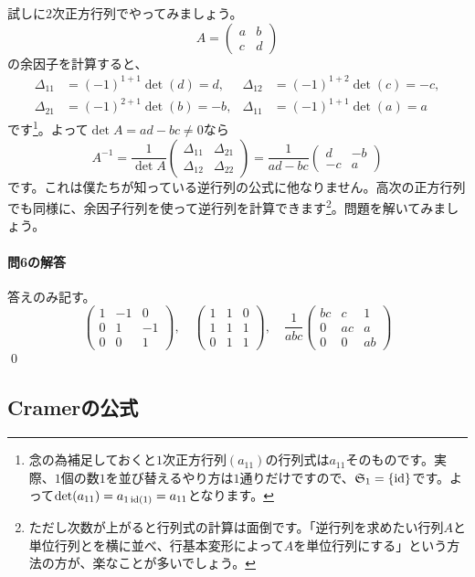 試しに$2$次正方行列でやってみましょう。
\[
A =
\begin{pmatrix}
a & b \\
c & d
\end{pmatrix}
\]
の余因子を計算すると、
\begin{align*}
\Delta_{11} &= (-1)^{1 + 1} \det(d) = d, &
\Delta_{12} &= (-1)^{1 + 2} \det(c) = -c, \\
\Delta_{21} &= (-1)^{2 + 1} \det(b) = -b, &
\Delta_{11} &= (-1)^{1 + 1} \det(a) = a
\end{align*}
です\footnote{念の為補足しておくと$1$次正方行列$(a_{11})$の行列式は$a_{11}$そのものです。実際、$1$個の数$1$を並び替えるやり方は$1$通りだけですので、$\mathfrak{S}_1 = \{\operatorname{id}\}$です。よって$\det (a_{11}) = a_{1 \operatorname{id}(1)} = a_{11}$となります。}。よって$\det A = ad - bc \neq 0$なら
\[
A^{-1}
= \frac{1}{\det A}
\begin{pmatrix}
\Delta_{11} & \Delta_{21} \\
\Delta_{12} & \Delta_{22}
\end{pmatrix}
= \frac{1}{ad - bc}
\begin{pmatrix}
d & -b \\
-c & a
\end{pmatrix}
\]
です。これは僕たちが知っている逆行列の公式に他なりません。高次の正方行列でも同様に、余因子行列を使って逆行列を計算できます\footnote{ただし次数が上がると行列式の計算は面倒です。「逆行列を求めたい行列$A$と単位行列とを横に並べ、行基本変形によって$A$を単位行列にする」という方法の方が、楽なことが多いでしょう。}。問題を解いてみましょう。

\paragraph{問6の解答} 答えのみ記す。
\[
\begin{pmatrix}
1 & -1 & 0 \\
0 & 1 & -1 \\
0 & 0 & 1
\end{pmatrix}, \quad
\begin{pmatrix}
1 & 1 & 0 \\
1 & 1 & 1 \\
0 & 1 & 1
\end{pmatrix}, \quad
\frac{1}{abc}
\begin{pmatrix}
bc & c & 1 \\
0 & ac & a \\
0 & 0 & ab
\end{pmatrix}
\]
\qed

\subsection{Cramerの公式}

